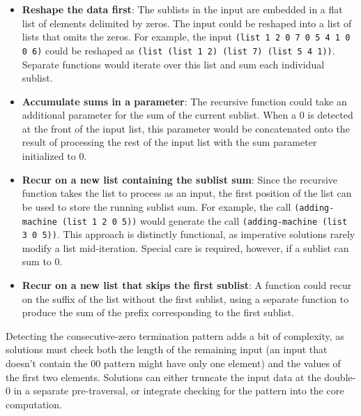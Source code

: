 \documentclass{sig-alternate-05-2015}
\begin{document}
\begin{itemize}
    \item \textbf{Reshape the data first}: The sublists in the input are embedded in a flat list of elements delimited by zeros. The input could be reshaped into a list of lists that omits the zeros. For example, the input \lstinline{(list 1 2 0 7 0 5 4 1 0 0 6)} could be reshaped as \lstinline{(list (list 1 2) (list 7) (list 5 4 1))}.  Separate functions would iterate over this list and sum each individual sublist. 

\item \textbf{Accumulate sums in a parameter}: The recursive function could take an additional parameter for the  sum of the current sublist. When a 0 is detected at the front of the input list, this parameter would be concatenated onto the result of processing the rest of the input list with the sum parameter initialized to 0.

    \item \textbf{Recur on a new list containing the sublist sum}: Since the recursive function takes the list to process as an input, the first position of the list can be used to store the running sublist sum.  For example, the call \lstinline{(adding-machine (list 1 2 0 5))} would generate the call \lstinline{(adding-machine (list 3 0 5))}. This approach is distinctly functional, as imperative solutions rarely modify a list mid-iteration.  Special care is required, however, if a sublist can sum to 0.
    
    \item \textbf{Recur on a new list that skips the first sublist}: A function could recur on the suffix of the list without the first sublist, using a separate function to produce the sum of the prefix corresponding to the first sublist.
    
\end{itemize}

Detecting the consecutive-zero termination pattern adds a bit of complexity, as solutions must check both the length of the remaining input (an input that doesn't contain the 00 pattern might have only one element) and the values of the first two elements.  Solutions can either truncate the input data at the double-0 in a separate pre-traversal, or integrate checking for the pattern into the core computation.
\end{document}
